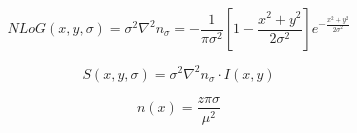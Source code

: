 \begin{equation}
    NLoG(x,y,\sigma) = \sigma^2\nabla^2 n_\sigma =  - \frac{1}{\pi\sigma^2}\left[1 - \frac{x^2 + y^2}{2\sigma^2}\right]e^{-\frac{x^2 + y^2}{2\sigma^2}}
\end{equation}

\begin{equation}
    S(x,y,\sigma) = \sigma^2\nabla^2 n_\sigma \cdot I(x,y)
\end{equation}

\begin{equation}
    n(x) = \frac{z\pi\sigma}{\mu^2}
\end{equation}